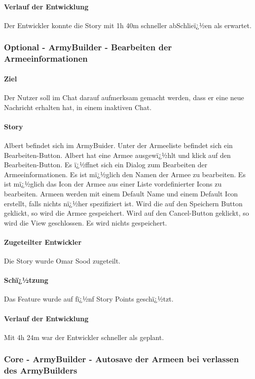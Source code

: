 \documentclass[12pt, titlepage]{scrartcl}
\begin{document}
			\paragraph{Verlauf der Entwicklung} 
			Der Entwickler konnte die Story mit 1h 40m schneller abSchlieï¿½en als erwartet.  
			\subsubsection{Optional - ArmyBuilder - Bearbeiten der Armeeinformationen}
			\paragraph{Ziel} Der Nutzer soll im Chat darauf aufmerksam gemacht werden, dass er eine neue Nachricht erhalten hat, in einem inaktiven Chat.
			\paragraph{Story} Albert befindet sich im ArmyBuider. Unter der Armeeliste befindet sich ein Bearbeiten-Button. Albert hat eine Armee ausgewï¿½hlt und klick auf den Bearbeiten-Button. Es ï¿½ffnet sich ein Dialog zum Bearbeiten der Armeeinformationen. Es ist mï¿½glich den Namen der Armee zu bearbeiten. Es ist mï¿½glich das Icon der Armee aus einer Liste vordefinierter Icons zu bearbeiten. Armeen werden mit einem Default Name und einem Default Icon erstellt, falls nichts nï¿½her spezifiziert ist. Wird die auf den Speichern Button geklickt, so wird die Armee gespeichert. Wird auf den Cancel-Button geklickt, so wird die View geschlossen. Es wird nichts gespeichert.
			\paragraph{Zugeteilter Entwickler} Die Story wurde Omar Sood zugeteilt.
			\paragraph{Schï¿½tzung}
			Das Feature wurde auf fï¿½nf Story Points geschï¿½tzt.
			\paragraph{Verlauf der Entwicklung} 
			Mit 4h 24m war der Entwickler schneller als geplant.  
			\subsubsection{Core - ArmyBuilder - Autosave der Armeen bei verlassen des ArmyBuilders}
\end{document}

